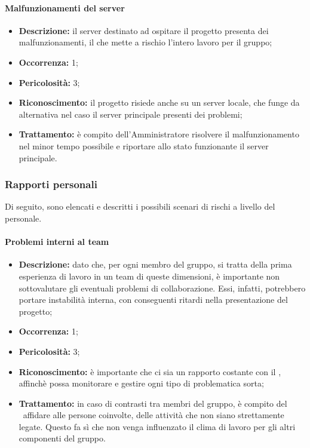 \paragraph{Malfunzionamenti del server}
\begin{itemize}
	\item \textbf{Descrizione:} il server destinato ad ospitare il progetto presenta dei malfunzionamenti, il che mette a rischio l'intero lavoro per il gruppo;
	\item \textbf{Occorrenza:} 1;
	\item \textbf{Pericolosità:} 3;
	\item \textbf{Riconoscimento:} il progetto risiede anche su un server locale, che funge da alternativa nel caso il server principale presenti dei problemi;
	\item \textbf{Trattamento:} è compito dell'Amministratore risolvere il malfunzionamento nel minor tempo possibile e riportare allo stato funzionante il server principale.
\end{itemize}

\subsubsection{Rapporti personali}

Di seguito, sono elencati e descritti i possibili scenari di rischi a livello del personale.

\paragraph{Problemi interni al team}
\begin{itemize}
	\item \textbf{Descrizione:} dato che, per ogni membro del gruppo, si tratta della prima esperienza di lavoro in un team di queste dimensioni, è importante non sottovalutare gli eventuali problemi di collaborazione. Essi, infatti, potrebbero portare instabilità interna, con conseguenti ritardi nella presentazione del progetto;
	\item \textbf{Occorrenza:} 1;
	\item \textbf{Pericolosità:} 3;
	\item \textbf{Riconoscimento:} è importante che ci sia un rapporto costante con il \textit{\RdP}, affinchè possa monitorare e gestire ogni tipo di problematica sorta;
	\item \textbf{Trattamento:} in caso di contrasti tra membri del gruppo, è compito del \textit{\RdP}\ affidare alle persone coinvolte, delle attività che non siano strettamente legate. Questo fa sì che non venga influenzato il clima di lavoro per gli altri componenti del gruppo.
\end{itemize}

